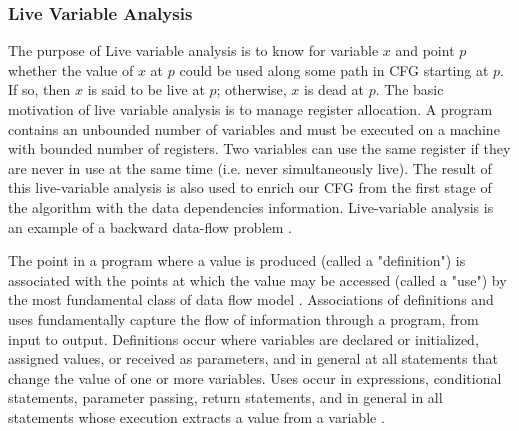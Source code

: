 \subsubsection{Live Variable Analysis}
The purpose of Live variable analysis is to know for variable $x$ and point $p$ whether the value of $x$ at $p$ could be used along some path in CFG starting at $p$. If so, then $x$ is said to be live at $p$; otherwise, $x$ is dead at $p$. The basic motivation of live variable analysis is to manage register allocation. A program contains an unbounded number of variables and must be executed on a machine with bounded number of registers. Two variables can use the same register if they are never in use at the same time (i.e. never simultaneously live). The result of this live-variable analysis is also used to enrich our CFG from the first stage of the algorithm with the data dependencies information. Live-variable analysis is an example of a backward data-flow problem \cite{lam2006compilers}. 

The point in a program where a value is produced (called a "definition") is associated with the points at which the value may be accessed (called a "use") by the most fundamental class of data flow model \cite{young2008software}. Associations of definitions and uses fundamentally capture the flow of information through a program, from input to output. Definitions occur where variables are declared or initialized, assigned values, or received as parameters, and in general at all statements that change the value of one or more variables. Uses occur in expressions, conditional statements, parameter passing, return statements, and in general in all statements whose execution extracts a value from a variable \cite{young2008software}.

